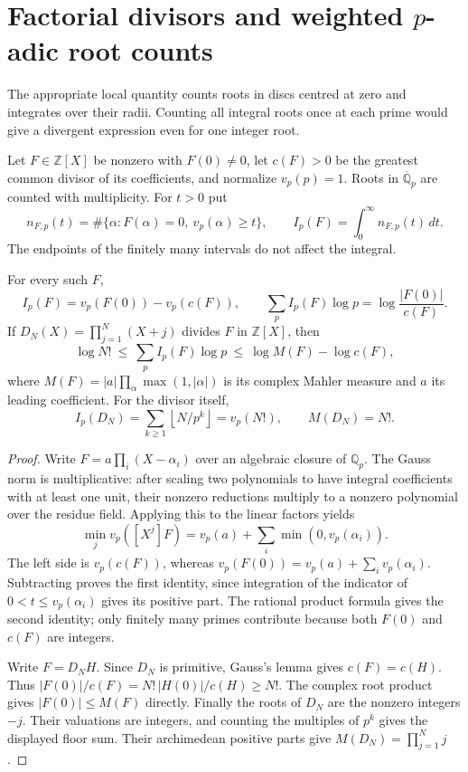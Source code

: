 \section{Factorial divisors and weighted $p$-adic root counts}
\label{sec:div-discs}
The appropriate local quantity counts roots in discs centred at zero
and integrates over their radii. Counting all integral roots once at
each prime would give a divergent expression even for one integer root.

Let $F\in\mathbb Z[X]$ be nonzero with $F(0)\ne0$, let $c(F)>0$
be the greatest common divisor of its coefficients, and normalize $v_p(p)=1$.
Roots in $\overline{\mathbb Q}_p$ are counted with multiplicity.
For $t>0$ put
\[
 n_{F,p}(t)=\#\{\alpha:F(\alpha)=0,\ v_p(\alpha)\ge t\},
 \qquad I_p(F)=\int_0^\infty n_{F,p}(t)\,dt.
\]
The endpoints of the finitely many intervals do not affect the integral.

\begin{proposition}\label{prop:disc-product-formula}
For every such $F$,
\[
 I_p(F)=v_p(F(0))-v_p(c(F)),\qquad
 \sum_p I_p(F)\log p=\log\frac{|F(0)|}{c(F)}.
\]
If $D_N(X)=\prod_{j=1}^N(X+j)$ divides $F$ in $\mathbb Z[X]$, then
\[
 \log N!\ \le\ \sum_p I_p(F)\log p
 \ \le\ \log M(F)-\log c(F),
\]
where $M(F)=|a|\prod_\alpha\max(1,|\alpha|)$ is its complex
Mahler measure and $a$ its leading coefficient.
For the divisor itself,
\[
 I_p(D_N)=\sum_{k\ge1}\left\lfloor N/p^k\right\rfloor=v_p(N!),
 \qquad M(D_N)=N!.
\]
\end{proposition}
\begin{proof}
Write $F=a\prod_i(X-\alpha_i)$ over an algebraic closure of
$\mathbb Q_p$. The Gauss norm is multiplicative: after scaling two
polynomials to have integral coefficients with at least one unit,
their nonzero reductions multiply to a nonzero polynomial over the
residue field. Applying this to the linear factors yields
\[
 \min_jv_p([X^j]F)=v_p(a)+\sum_i\min(0,v_p(\alpha_i)).
\]
The left side is $v_p(c(F))$, whereas
$v_p(F(0))=v_p(a)+\sum_i v_p(\alpha_i)$.
Subtracting proves the first identity, since integration of the
indicator of $0<t\le v_p(\alpha_i)$ gives its positive part.
The rational product formula gives the second identity; only finitely
many primes contribute because both $F(0)$ and $c(F)$ are integers.

Write $F=D_NH$. Since $D_N$ is primitive, Gauss's lemma gives
$c(F)=c(H)$. Thus
$|F(0)|/c(F)=N!\,|H(0)|/c(H)\ge N!$.
The complex root product gives $|F(0)|\le M(F)$ directly.
Finally the roots of $D_N$ are the nonzero integers $-j$.
Their valuations are integers, and counting the multiples of $p^k$
gives the displayed floor sum. Their archimedean positive parts
give $M(D_N)=\prod_{j=1}^Nj$.
\end{proof}

